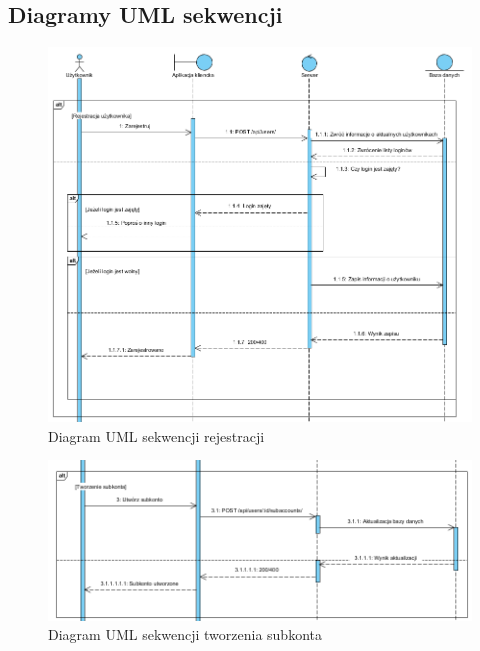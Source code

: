 \documentclass{article}
\begin{document}
	\subsection{Diagramy UML sekwencji}
	\begin{figure}[H]
		
		\hspace*{-3cm} 
		\includegraphics[scale=0.8]{assets/umlSEQ1.png}
		\caption[]{Diagram UML sekwencji rejestracji}
		\label{fig:umlreje}
	\end{figure} 
	\begin{figure}[h]
		\vspace{-2.5cm}
		\hspace*{-3cm} 
		\includegraphics[scale=0.8]{assets/umlSEQ2.png}
		\caption[]{Diagram UML sekwencji tworzenia subkonta}
		\label{fig:umlsub}
	\end{figure} 
\end{document}
